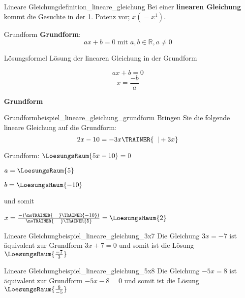 \begin{definition}{Lineare Gleichung}{definition_lineare_gleichung}
  Bei einer \textbf{linearen Gleichung} kommt die Gesuchte in der
  1. Potenz vor; \zB $x (= x^1)$.
\end{definition}

\begin{definition}{Grundform}{}
  \textbf{Grundform}:\\
  $$ax+b=0 \textrm{ mit } a,b\in\mathbb{R}, a\ne 0$$
  
  \end{definition}

\begin{gesetz}{Lösungsformel}{}
 Lösung der linearen Gleichung in der Grundform

 $$ax+b=0$$
  $$x = \frac{-b}a$$
  
\end{gesetz}

\newpage
\textbf{Grundform}\\

\begin{beispiel}{Grundform}{beispiel_lineare_gleichung_grundform}
  Bringen Sie die folgende lineare Gleichung auf die Grundform:
  $$2x-10 = -3x\TRAINER{\,\,\,| +3x}$$

  Grundform: $\LoesungsRaum{5x-10} = 0$

  $a = \LoesungsRaum{5}$

  $b = \LoesungsRaum{-10}$

  und somit

  \LARGE{$x=\frac{-(\noTRAINER{\,\,\,\,\,\,}\TRAINER{-10})}{\noTRAINER{\,\,\,\,\,\,\,}\TRAINER{5}}
    = \LoesungsRaum{2}$}

\end{beispiel}


\begin{beispiel}{Lineare Gleichung}{beispiel_lineare_gleichung_3x7}
  Die Gleichung $3x=-7$ ist äquivalent zur Grundform $3x+7=0$ und somit ist die Lösung $\LoesungsRaum{\frac{-7}{3}}$
  \end{beispiel}

\begin{beispiel}{Lineare Gleichung}{beispiel_lineare_gleichung_5x8}
  Die Gleichung $-5x=8$ ist äquivalent zur Grundform $-5x-8=0$ und somit ist die Lösung $\LoesungsRaum{\frac{8}{-5}}$
\end{beispiel}
\newpage

